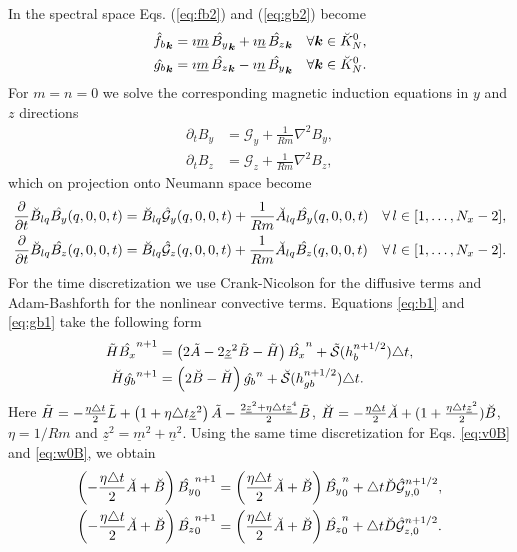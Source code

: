 In the spectral space Eqs. (\ref{eq:fb2}) and (\ref{eq:gb2}) become
\begin{align}
\hat{f_b}_{\bm{k}} &= \imath \underline{m}\, \hat{B_y}_{\bm{k}} + \imath 
\underline{n}\, \hat{B_z}_{\bm{k}} &\forall \bm{k} \in \breve{K}_N^0, \label{eq:fb3} \\
\hat{g_b}_{\bm{k}} &= \imath \underline{m}\, \hat{B_z}_{\bm{k}} - \imath 
\underline{n}\, \hat{B_y}_{\bm{k}} & \forall \bm{k} \in \breve{K}_N^0. \label{eq:gb3}
\end{align}
For $m=n=0$ we solve the corresponding magnetic induction equations in $y$ and $z$ directions
\begin{align}
\partial_t B_y &= \mathcal{G}_y + \frac{1}{Rm}\nabla^2 B_y, \\
\partial_t B_z &= \mathcal{G}_z + \frac{1}{Rm}\nabla^2 B_z, 
\end{align}
which on projection onto Neumann space become
\begin{align}
\frac{\partial }{\partial t} \breve{B}_{lq}\hat{B_y}(q, 0, 0, t) &= 
\breve{B}_{lq}\hat{\mathcal{G}}_y(q, 0, 0, t) +  \frac{1}{Rm} \breve{A}_{lq} \hat{B_y}(q, 0, 0, t) 
& \forall\, l \in [1, 
\ldots, N_x-2], \label{eq:v0B}\\
\frac{\partial }{\partial t} \breve{B}_{lq}\hat{B_z}(q, 0, 0, t) &= 
\breve{B}_{lq}\hat{\mathcal{G}}_z(q, 0, 0, t) +  \frac{1}{Rm} \breve{A}_{lq} \hat{B_z}(q, 0, 0, t) 
& \forall\, l \in [1, \ldots, N_x-2].\label{eq:w0B}
\end{align}
For the time discretization we use Crank-Nicolson for the diffusive terms and Adam-Bashforth for the nonlinear convective terms. Equations \ref{eq:b1} and \ref{eq:gb1} take the following form
\begin{align}
\tilde{H}\hat{B_x}^{n+1} & = \left(2\tilde{A} - 2\underline{z}^2\tilde{B} - \tilde{H} 
\right)\hat{B_x}^{n} + \tilde{\mathcal{S}}(h_b^{n+1/2}) \triangle t, 
\label{eq:Bxfin}\\ 
\breve{H} \hat{g_b}^{n+1} &= \left(2 \breve{B}-\breve{H}\right) 
\hat{g_b}^{n} + \breve{\mathcal{S}}(h_{gb}^{n+1/2}) \triangle t. \label{eq:gbfin}
\end{align}
Here $\tilde{H} = -\frac{\eta \triangle t}{2}\tilde{L} + \left( 1 + \eta \triangle t 
\underline{z}^2 \right) \tilde{A} - \frac{2\underline{z}^2 + \eta \triangle t 
\underline{z}^4}{2} \tilde{B}$, $\breve{H} = -\frac{\eta \triangle t}{2}\breve{A} + (1 + 
\frac{\eta \triangle t \underline{z}^2}{2}) \breve{B}$, $\eta = 1/Rm$ and $\underline{z}^2 = 
\underline{m}^2 + \underline{n}^2$. Using the same time discretization for Eqs. \ref{eq:v0B} and \ref{eq:w0B}, we obtain
\begin{align}
\left(-\frac{\eta \triangle t}{2}\breve{A} + \breve{B} \right)\hat{B_y}_0^{n+1} &= 
\left(\frac{\eta \triangle t}{2}\breve{A} + \breve{B} 
\right)\hat{B_y}^{n}_0 + \triangle t \breve{D}\hat{\mathcal{G}}_{y,0}^{n+1/2}, \label{eq:v00B} \\
\left(-\frac{\eta \triangle t}{2}\breve{A} + \breve{B} \right)\hat{B_z}_0^{n+1} &= 
\left(\frac{\eta \triangle t}{2}\breve{A} + \breve{B} 
\right)\hat{B_z}^{n}_0 + \triangle t \breve{D}\hat{\mathcal{G}}_{z,0}^{n+1/2}. \label{eq:w00B}
\end{align}















